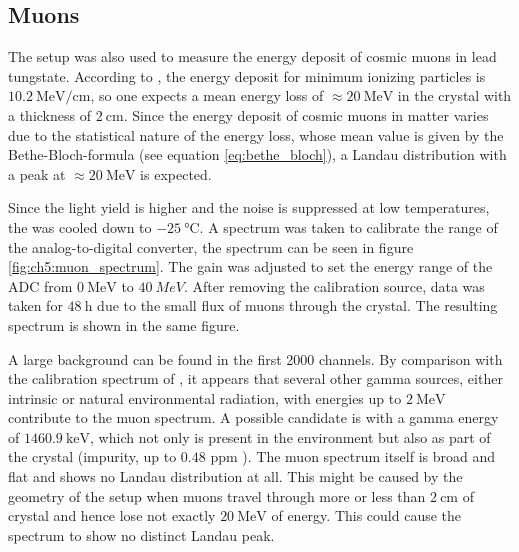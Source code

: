 \subsection{Muons}
The \pwo{} setup was also used to measure the energy deposit of cosmic muons in lead tungstate. According to \cite{panda_emctdr}, the energy deposit for minimum ionizing particles is $\SI{10.2}{\MeV\per\centi\meter}$, so one expects a mean energy loss of $\approx \SI{20}{\MeV}$ in the crystal with a thickness of $\SI{2}{\centi\meter}$. Since the energy deposit of cosmic muons in matter varies due to the statistical nature of the energy loss, whose mean value is given by the Bethe-Bloch-formula (see equation \eqref{eq:bethe_bloch}), a Landau distribution with a peak at $\approx \SI{20}{\MeV}$ is expected. \par 
Since the light yield is higher and the noise is suppressed at low temperatures, the \pwo{} was cooled down to $\SI{-25}{\degreeCelsius}$. A \co{} spectrum was taken to calibrate the range of the analog-to-digital converter, the spectrum can be seen in figure \ref{fig:ch5:muon_spectrum}. The gain was adjusted to set the energy range of the ADC from $\SI{0}{\MeV}$ to $\SI{40}{MeV}$. After removing the calibration source, data was taken for $\SI{48}{\hour}$ due to the small flux of muons through the crystal. The resulting spectrum is shown in the same figure.  \par 
A large background can be found in the first 2000 channels. By comparison with the calibration spectrum of \co{}, it appears that several other gamma sources, either intrinsic or natural environmental radiation, with energies up to $\SI{2}{\MeV}$ contribute to the muon spectrum. A possible candidate is \ka{} with a gamma energy of $\SI{1460.9}{\keV}$, which not only is present in the environment but also as part of the crystal (impurity, up to $0.48$ ppm \cite{analytical_report}). The muon spectrum itself is broad and flat and shows no Landau distribution at all. This might be caused by the geometry of the setup when muons travel through more or less than $\SI{2}{\centi\meter}$ of crystal and hence lose not exactly $\SI{20}{\MeV}$ of energy. This could cause the spectrum to show no distinct Landau peak. \par 
